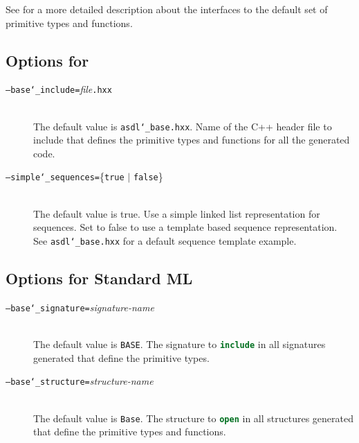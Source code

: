 See  for a more detailed description about the interfaces
to the default set of primitive types and functions.

\subsection{Options for \Cplusplus}

\begin{description}
  \item[\normalfont\texttt{--base\char`\_include=}\textit{file}\texttt{.hxx}] \mbox{}\\
    The default value is \texttt{asdl\char`\_base.hxx}. Name of the C++ header file to
    include that defines the primitive types and functions for all the generated
    code. 
  \item[\normalfont\texttt{--simple\char`\_sequences=}\{\texttt{true} $|$ \texttt{false}\}] \mbox{}\\
    The default value is true. Use a simple linked list representation 
    for sequences. Set to false to use a template based sequence 
    representation. See \texttt{asdl\char`\_base.hxx} for a default sequence template 
    example. 
\end{description}%

\subsection{Options for Standard ML}
\begin{description}
  \item[\normalfont\texttt{--base\char`\_signature=}\textit{signature-name}] \mbox{}\\
    The default value is \texttt{BASE}.
    The signature to \lstinline[language=SML]!include! in
    all signatures generated that define the primitive types.
  \item[\normalfont\texttt{--base\char`\_structure=}\textit{structure-name}] \mbox{}\\
    The default value is \texttt{Base}.
    The structure to \lstinline[language=SML]!open! in
    all structures generated that define the primitive types and functions.
\end{description}%

